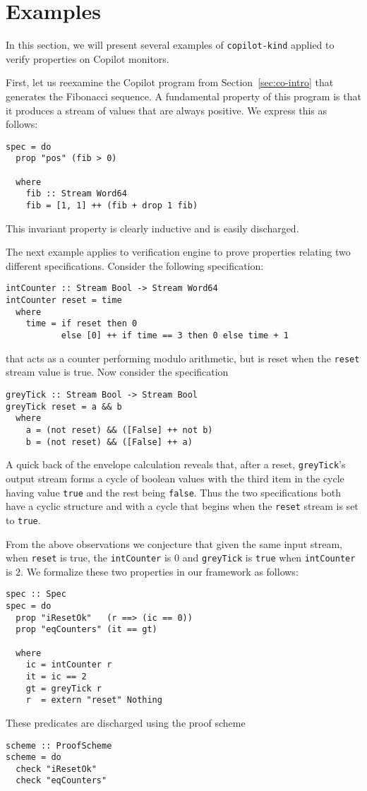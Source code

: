 \section{Examples}\label{sec:example}

In this section,  we will present several examples of
\texttt{copilot-kind} applied to verify properties on Copilot
monitors.


 First, let us reexamine the Copilot program from
 Section~\ref{sec:co-intro} that generates the  Fibonacci
 sequence. A fundamental property of this program is that it produces
 a stream of values that are always positive. We express this as follows:
\begin{lstlisting}[frame=single]
spec = do
  prop "pos" (fib > 0)

  where
    fib :: Stream Word64
    fib = [1, 1] ++ (fib + drop 1 fib)
\end{lstlisting}
This  invariant property is clearly inductive and is easily
discharged. 
 
The next example applies to verification engine to prove properties
relating two different specifications. Consider the following
specification:
\begin{lstlisting}[frame=single]
intCounter :: Stream Bool -> Stream Word64
intCounter reset = time
  where 
    time = if reset then 0
           else [0] ++ if time == 3 then 0 else time + 1
\end{lstlisting}
that acts as a counter performing modulo arithmetic, but is
reset when the \texttt{reset} stream value is true.  Now consider the
specification
\begin{lstlisting}[frame=single]
greyTick :: Stream Bool -> Stream Bool
greyTick reset = a && b
  where
    a = (not reset) && ([False] ++ not b)
    b = (not reset) && ([False] ++ a)
\end{lstlisting}
A quick back of the envelope calculation reveals that,
after a reset, \texttt{greyTick}'s output stream forms a cycle of
boolean values with the third item in the cycle having value
\texttt{true} and the rest being \texttt{false}.  Thus the two
specifications both have a cyclic structure and with a cycle that
begins when the \texttt{reset} stream is set to \texttt{true}.  

From the above observations we 
conjecture that given the same input stream, when \texttt{reset} is
true,  the \texttt{intCounter} is $0$ and \texttt{greyTick} is
\texttt{true} when \texttt{intCounter} is $2.$ We formalize these two
properties in our framework as follows:
\begin{lstlisting}[frame=single]
spec :: Spec
spec = do
  prop "iResetOk"   (r ==> (ic == 0))
  prop "eqCounters" (it == gt)
  
  where
    ic = intCounter r
    it = ic == 2
    gt = greyTick r
    r  = extern "reset" Nothing
\end{lstlisting}
These predicates are discharged using the proof scheme
\begin{lstlisting}[frame=single]
scheme :: ProofScheme
scheme = do
  check "iResetOk"
  check "eqCounters"
\end{lstlisting}  
